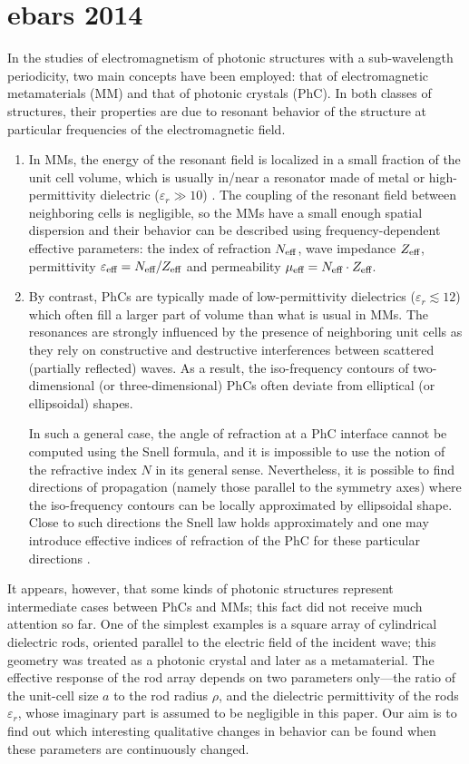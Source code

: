 \documentclass[letterpaper,12pt]{report}
\begin{document}
\chapter{ebars 2014}
In the studies of electromagnetism of photonic structures with a sub-wavelength
periodicity, two main concepts have been employed: that of electromagnetic metamaterials
(MM) and that of photonic crystals (PhC). In both classes of structures, their properties
are due to resonant behavior of the structure at particular frequencies of the
electromagnetic field.
\begin{enumerate}
\item {
In MMs, the energy of the resonant field is localized in a small fraction of the unit
cell volume, which is usually in/near a resonator made of metal or high-permittivity
dielectric ($\varepsilon_r \gg 10$) \cite{vendik2012tunable}. 
The coupling of the resonant field between
neighboring cells is negligible, so the MMs have a small enough spatial dispersion and
their behavior can be described using frequency-dependent effective parameters: the index
of refraction $N_{\text{eff} }$, wave impedance $Z_{\text{eff} }$, permittivity $\varepsilon_{\text{eff} }=N_{\text{eff} }/Z_{\text{eff} }$ and
permeability $\mu_{\text{eff} } = N_{\text{eff} }\cdot Z_{\text{eff} }$.
}
\item{
By contrast, PhCs are typically made of low-permittivity dielectrics ($\varepsilon_r
\lesssim 12$) which often fill a larger part of volume than what is usual in MMs. The
resonances are strongly influenced by the presence of neighboring unit cells as they rely
on constructive and destructive interferences between scattered (partially reflected)
waves. As a result, the iso-frequency contours of two-dimensional (or three-dimensional)
PhCs often deviate from elliptical (or ellipsoidal) shapes.

In such a general case, the angle of refraction at a PhC interface cannot be computed
using the Snell formula, and it is impossible to use the notion of the
refractive index $N$ in its general sense. Nevertheless, it is possible to find directions of
propagation (namely those parallel to the symmetry axes) where the iso-frequency contours
can be locally approximated by ellipsoidal shape. Close to such directions the
Snell law holds approximately and one may introduce effective indices of
refraction of the PhC for these particular directions \cite{yannopapas2005negative}.
}
\end{enumerate}

It appears, however, that some kinds of photonic structures represent intermediate cases
between PhCs and MMs; this fact did not receive much attention so far. One of the
simplest examples is a square array of cylindrical dielectric rods, oriented parallel to
the electric field of the incident wave; this geometry was treated as a photonic
crystal\cite{plihal1991two} and later as a metamaterial\cite{zhao2009mie,Vynck2009, felbacq2009}. The
effective response of the rod array depends on two parameters only---the ratio of the
unit-cell size $a$ to the rod radius $\rho$, and the dielectric permittivity of the rods
$\varepsilon_r$, whose imaginary part is assumed to be negligible in this paper. Our aim is to
find out which interesting qualitative changes in behavior can be found when these parameters
are continuously changed.
\end{document}
